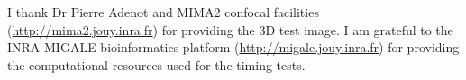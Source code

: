 \documentclass{InsightArticle}
\begin{document}
I thank Dr Pierre Adenot and MIMA2 confocal facilities
(\url{http://mima2.jouy.inra.fr}) for providing the 3D test image.
I am grateful to the INRA MIGALE bioinformatics platform
(\url{http://migale.jouy.inra.fr}) for providing the computational resources
used for the timing tests.


\appendix





\nocite{ITKSoftwareGuide}
\end{document}
